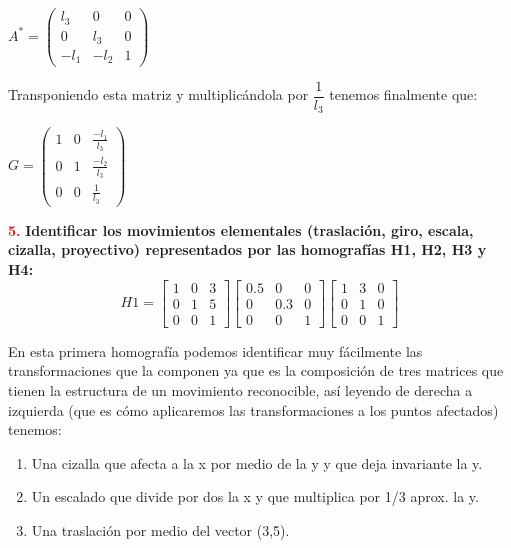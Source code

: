 \documentclass[10pt,a4paper]{article}
\begin{document}
\begin{center}
$A^*=\begin{pmatrix}
l_3&0&0\\0&l_3&0\\-l_1&-l_2&1
\end{pmatrix}$
\end{center}

Transponiendo esta matriz y multiplicándola por $\dfrac{1}{l_3}$ tenemos finalmente que:\\

\begin{center}
$G=\begin{pmatrix}
1&0&	\frac{-l_1}{l_3}\\
0&1&\frac{-l_2}{l_3}\\
0&0&\frac{1}{l_3}
\end{pmatrix}$
\end{center}


\textcolor{red}{\textbf{5.}} \textbf{Identificar los movimientos elementales (traslación, giro, escala, cizalla, proyectivo) representados por las homografías H1, H2, H3 y H4:}\\

\[H1 = 
\begin{bmatrix}
1&0&3\\
0&1&5\\
0&0&1
\end{bmatrix}
\begin{bmatrix}
0.5&0&0\\
0&0.3&0\\
0&0&1
\end{bmatrix}
\begin{bmatrix}
1&3&0\\
0&1&0\\
0&0&1
\end{bmatrix}
\]

En esta primera homografía podemos identificar muy fácilmente las transformaciones que la componen ya que es la composición de tres matrices que tienen la estructura de un movimiento reconocible, así leyendo de derecha a izquierda (que es cómo aplicaremos las transformaciones a los puntos afectados) tenemos:

\begin{enumerate}
\item Una cizalla que afecta a la x por medio de la y y que deja invariante la y.
\item Un escalado que divide por dos la x y que multiplica por 1/3 aprox. la y.
\item Una traslación por medio del vector (3,5).
\end{enumerate}
\end{document}
